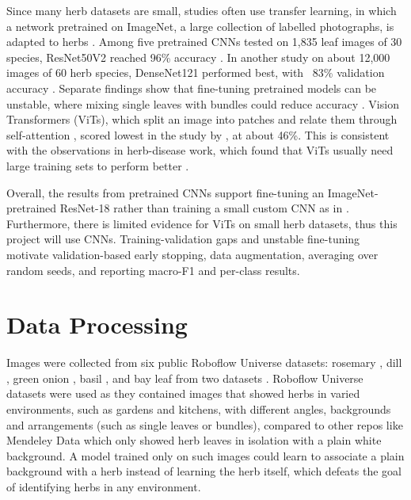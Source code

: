 \documentclass[final]{article}
\begin{document}
Since many herb datasets are small, studies often use transfer learning, in which a network pretrained on ImageNet, a large collection of labelled photographs, is adapted to herbs \citep{mulugeta2024review}. 
Among five pretrained CNNs tested on 1,835 leaf images of 30 species, ResNet50V2 reached 96\% accuracy \citep{raina2026herbal}. 
In another study on about 12,000 images of 60 herb species, DenseNet121 performed best, with ~83\% validation accuracy \citep{thapa2025herb}. 
Separate findings show that fine-tuning pretrained models can be unstable, where mixing single leaves with bundles could reduce accuracy \citep{antunes2025aromatic}. 
Vision Transformers (ViTs), which split an image into patches and relate them through self-attention \citep{dosovitskiy2021vit}, scored lowest in the study by \citet{thapa2025herb}, at about 46\%. 
This is consistent with the observations in herb-disease work, which found that ViTs usually need large training sets to perform better \citep{li2023pmvt}.

Overall, the results from pretrained CNNs \citep{raina2026herbal,thapa2025herb} support fine-tuning an ImageNet-pretrained ResNet-18 \citep{he2016resnet} rather than training a small custom CNN as in \citet{tan2021herb}.
Furthermore, there is limited evidence for ViTs on small herb datasets, thus this project will use CNNs. Training-validation gaps \citep{thapa2025herb} and unstable fine-tuning \citep{antunes2025aromatic} motivate validation-based early stopping, data augmentation, averaging over random seeds, and reporting macro-F1 and per-class results.

\section*{Data Processing}
Images were collected from six public Roboflow Universe datasets: rosemary \citep{smartpot2022rosemary}, dill \citep{yolo2024dill}, green onion \citep{verduras22024greenonion}, basil \citep{chickenduck2024basil}, and bay leaf from two datasets \citep{myproject02024bayleaf,nialieva2024defne}. 
Roboflow Universe datasets were used as they contained images that showed herbs in varied environments, such as gardens and kitchens, with different angles, backgrounds and arrangements (such as single leaves or bundles), compared to other repos like Mendeley Data which only showed herb leaves in isolation with a plain white background. A model trained only on such images could learn to associate a plain background with a herb instead of learning the herb itself, which defeats the goal of identifying herbs in any environment. 
\end{document}
